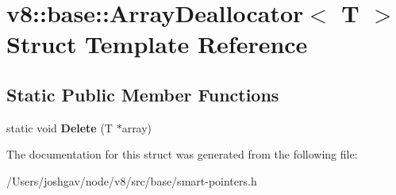 \hypertarget{structv8_1_1base_1_1_array_deallocator}{}\section{v8\+:\+:base\+:\+:Array\+Deallocator$<$ T $>$ Struct Template Reference}
\label{structv8_1_1base_1_1_array_deallocator}
\subsection*{Static Public Member Functions}
\begin{DoxyCompactItemize}
\item 
static void {\bfseries Delete} (T $\ast$array)\hypertarget{structv8_1_1base_1_1_array_deallocator_af96065b52610a96a631db98da1eac008}{}\label{structv8_1_1base_1_1_array_deallocator_af96065b52610a96a631db98da1eac008}

\end{DoxyCompactItemize}


The documentation for this struct was generated from the following file\+:\begin{DoxyCompactItemize}
\item 
/\+Users/joshgav/node/v8/src/base/smart-\/pointers.\+h\end{DoxyCompactItemize}
